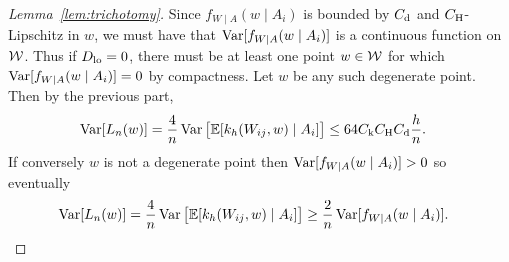 \begin{proof}[Lemma~\ref{lem:trichotomy}]

  Since $f_{W \mid A}(w \mid A_i)$
  is bounded by $C_\mathrm{d}$ and $C_\mathrm{H}$-Lipschitz in $w$,
  we must have that
  $\operatorname{Var}[f_{W \mid A}(w \mid A_i)]$
  is a continuous function on $\mathcal{W}$.
  Thus if $D_{\textup{lo}} = 0$,
  there must be at least one point $w \in \mathcal{W}$
  for which
  $\operatorname{Var}[f_{W \mid A}(w \mid A_i)] = 0$
  by compactness.
  Let $w$ be any such degenerate point.
  Then by the previous part,
  \begin{align*}
    \operatorname{Var}[L_n(w)] =
    \frac{4}{n} \operatorname{Var}\big[\mathbb{E}[k_h(W_{i j},w) \mid A_i]\big]
    &\leq
    64 C_\mathrm{k} C_\mathrm{H} C_\mathrm{d} \frac{h}{n}.
  \end{align*}
  If conversely $w$ is not a degenerate point
  then
  $\operatorname{Var}[f_{W \mid A}(w \mid A_i)] > 0$
  so eventually
  \begin{align*}
    \operatorname{Var}[L_n(w)]
    = \frac{4}{n}
    \operatorname{Var}\big[\mathbb{E}[k_h(W_{i j},w) \mid A_i]\big]
    &\geq
    \frac{2}{n}
    \operatorname{Var}[f_{W \mid A}(w \mid A_i)].
  \end{align*}
\end{proof}


